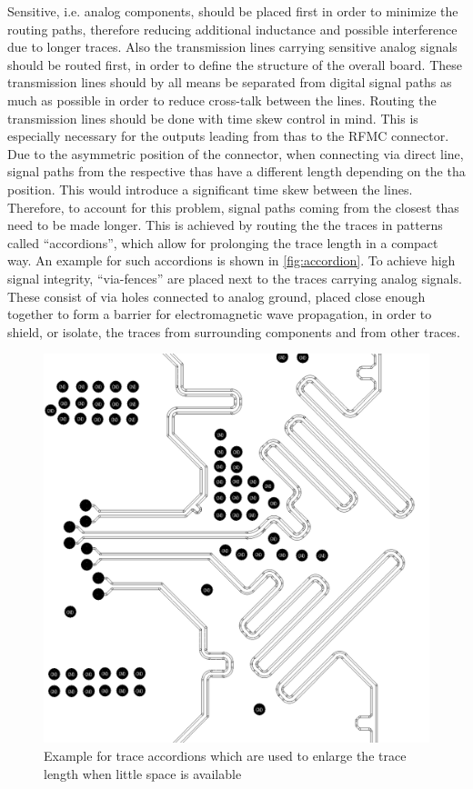 Sensitive, i.e. analog components, should be placed first in order to minimize the routing paths, therefore reducing additional inductance and possible interference due to longer traces.
Also the transmission lines carrying sensitive analog signals should be routed first, in order to define the structure of the overall board. 
These transmission lines should by all means be separated from digital signal paths as much as possible in order to reduce cross-talk between the lines. 
Routing the transmission lines should be done with time skew control in mind. 
This is especially necessary for the outputs leading from \glspl{tha} to the RFMC connector. 
Due to the asymmetric position of the connector, when connecting via direct line, signal paths from the respective \glspl{tha} have a different length depending on the \gls{tha} position. 
This would introduce a significant time skew between the lines.
Therefore, to account for this problem, signal paths coming from the closest \glspl{tha} need to be made longer.
This is achieved by routing the the traces in patterns called ``accordions'', which allow for prolonging the trace length in a compact way.
An example for such accordions is shown in \autoref{fig:accordion}.
To achieve high signal integrity, ``via-fences'' are placed next to the traces carrying analog signals. 
These consist of via holes connected to analog ground, placed close enough together to form a barrier for electromagnetic wave propagation, in order to shield, or isolate, the traces from surrounding components and from other traces. 
\begin{figure}[tbh]
	\centering
	\includegraphics[width = \textwidth]{chap/04-work/img/accordion}
	\caption[Trace accordions]{Example for trace accordions which are used to enlarge the trace length when little space is available}
	\label{fig:accordion}
\end{figure}


